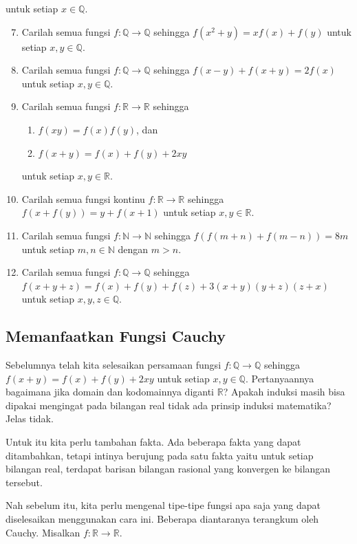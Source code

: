 \documentclass{article}
\begin{document}
\noindent untuk setiap $x \in \mathbb{Q}$.
\begin{enumerate}
\setcounter{enumi}{6}
\item Carilah semua fungsi $f : \mathbb{Q} \rightarrow \mathbb{Q}$ sehingga $f(x^2+y) = x f(x) + f(y)$ untuk setiap $x, y \in \mathbb{Q}$.
\item Carilah semua fungsi $f : \mathbb{Q} \rightarrow \mathbb{Q}$ sehingga $f(x-y)+f(x+y) = 2f(x)$ untuk setiap $x, y \in \mathbb{Q}$.
\item Carilah semua fungsi $f : \mathbb{R} \rightarrow \mathbb{R}$ sehingga
\begin{enumerate}
\item $f(xy) = f(x)f(y)$, dan
\item $f(x+y) = f(x)+f(y)+2xy$
\end{enumerate}
untuk setiap $x, y \in \mathbb{R}$.
\item Carilah semua fungsi kontinu $f : \mathbb{R} \rightarrow \mathbb{R}$ sehingga $f(x+f(y)) = y + f(x+1)$ untuk setiap $x, y \in \mathbb{R}$.
\item Carilah semua fungsi $f : \mathbb{N} \rightarrow \mathbb{N}$ sehingga $f(f(m+n)+f(m-n)) = 8m$ untuk setiap $m, n \in \mathbb{N}$ dengan $m > n$.
\item Carilah semua fungsi $f : \mathbb{Q} \rightarrow \mathbb{Q}$ sehingga $f(x+y+z) = f(x)+f(y)+f(z)+3(x+y)(y+z)(z+x)$ untuk setiap $x, y, z \in \mathbb{Q}$.
\end{enumerate}

\subsection{Memanfaatkan Fungsi Cauchy}
Sebelumnya telah kita selesaikan persamaan fungsi $f : \mathbb{Q} \rightarrow \mathbb{Q}$ sehingga $f(x+y) = f(x)+f(y)+2xy$ untuk setiap $x, y \in \mathbb{Q}$. Pertanyaannya bagaimana jika domain dan kodomainnya diganti $\mathbb{R}$? Apakah induksi masih bisa dipakai mengingat pada bilangan real tidak ada prinsip induksi matematika? Jelas tidak.

Untuk itu kita perlu tambahan fakta. Ada beberapa fakta yang dapat ditambahkan, tetapi intinya berujung pada satu fakta yaitu untuk setiap bilangan real, terdapat barisan bilangan rasional yang konvergen ke bilangan tersebut.

Nah sebelum itu, kita perlu mengenal tipe-tipe fungsi apa saja yang dapat diselesaikan menggunakan cara ini. Beberapa diantaranya terangkum oleh Cauchy. Misalkan $f : \mathbb{R} \rightarrow \mathbb{R}$.
\end{document}
